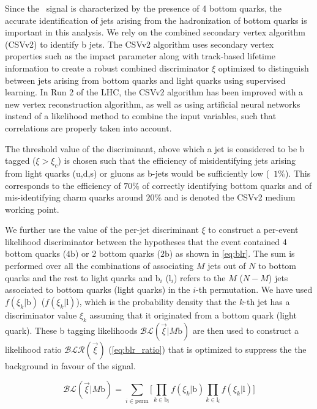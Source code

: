Since the \ttHbb~signal is characterized by the presence of 4 bottom quarks, the accurate identification of jets arising from the hadronization of bottom quarks is important in this analysis. We rely on the combined secondary vertex algorithm (CSVv2) \cite{Chatrchyan:2012jua} to identify b jets. The CSVv2 algorithm uses secondary vertex properties such as the impact parameter along with track-based lifetime information to create a robust combined discriminator $\xi$ optimized to distinguish between jets arising from bottom quarks and light quarks using supervised learning. In Run 2 of the LHC, the CSVv2 algorithm has been improved with a new vertex reconstruction algorithm, as well as using artificial neural networks instead of a likelihood method to combine the input variables, such that correlations are properly taken into account\cite{CMS-PAS-BTV-15-001}.

The threshold value of the discriminant, above which a jet is considered to be b tagged ($\xi > \xi_c$) is chosen such that the efficiency of misidentifying jets arising from light quarks (u,d,s) or gluons as b-jets would be sufficiently low (~$1\%$). This corresponds to the efficiency of $70\%$ of correctly identifying bottom quarks and of mis-identifying charm quarks around $20\%$ and is denoted the CSVv2 medium working point.

We further use the value of the per-jet discriminant $\xi$ to construct a per-event likelihood discriminator between the hypotheses that the event contained 4 bottom quarks ($4\mathrm{b}$) or 2 bottom quarks ($2\mathrm{b}$) as shown in \cref{eq:blr}. The sum is performed over all the combinations of associating $M$ jets out of $N$ to bottom quarks and the rest to light quarks and $\mathrm{b}_i$ ($\mathrm{l}_i$) refers to the $M$ ($N-M$) jets associated to bottom quarks (light quarks) in the $i$-th permutation. We have used $f(\xi_k | \mathrm{b})$ ($f(\xi_k | \mathrm{l})$), which is the probability density that the $k$-th jet has a discriminator value $\xi_k$ assuming that it originated from a bottom quark (light quark). These b tagging likelihoods $\mathcal{BL}(\vec{\xi} | M\mathrm{b})$ are then used to construct a likelihood ratio $\mathcal{BLR}(\vec{\xi})$ (\cref{eq:blr_ratio}) that is optimized to suppress the the \ttlf background in favour of the \ttHbb signal.

\begin{equation}
\label{eq:blr}
\mathcal{BL}(\vec{\xi} | M\mathrm{b}) = \sum_{i \in \mathrm{perm}} \biggl[ \prod_{k \in \mathrm{b}_i} f(\xi_k | \mathrm{b}) \prod_{k \in \mathrm{l}_i} f(\xi_k | \mathrm{l}) \biggr]
\end{equation}

